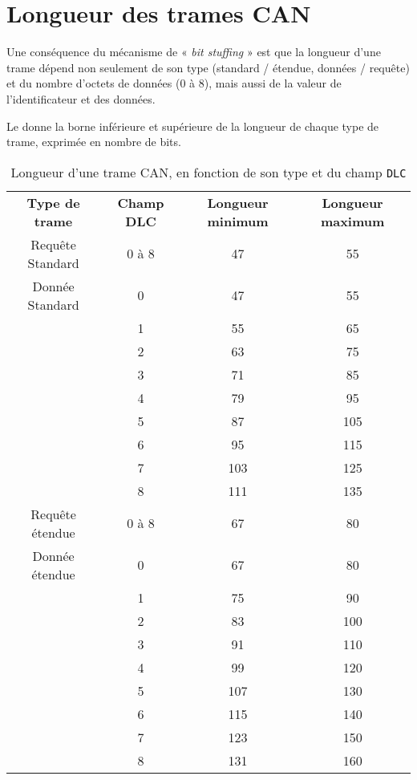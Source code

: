 \section{Longueur des trames CAN}

Une conséquence du mécanisme de « \emph{bit stuffing} » est que la longueur d'une trame dépend non seulement de son type (standard / étendue, données / requête) et du nombre d'octets de données ($0$ à $8$), mais aussi de la valeur de l'identificateur et des données.

Le  donne la borne inférieure et supérieure de la longueur de chaque type de trame, exprimée en nombre de bits.
 
\begin{table}[!t]
  \small
  \centering
  \begin{tabular}{cccc}
    \textbf{Type de trame}& \textbf{Champ DLC} & \textbf{Longueur minimum} & \textbf{Longueur maximum} \\
    Requête Standard & 0 à 8 & 47 & 55 \\
    Donnée Standard & 0 & 47 & 55 \\
             & 1 & 55 & 65 \\
             & 2 & 63 & 75 \\
             & 3 & 71 & 85 \\
             & 4 & 79 & 95 \\
             & 5 & 87 & 105 \\
             & 6 & 95 & 115 \\
             & 7 & 103 & 125 \\
             & 8 & 111 & 135 \\
    Requête étendue  & 0 à 8 & 67 & 80 \\
    Donnée étendue  & 0 & 67 & 80 \\
             & 1 & 75 & 90 \\
             & 2 & 83 & 100 \\
             & 3 & 91 & 110 \\
             & 4 & 99 & 120 \\
             & 5 & 107 & 130 \\
             & 6 & 115 & 140 \\
             & 7 & 123 & 150 \\
             & 8 & 131 & 160 \\
   \end{tabular}
  \caption{Longueur d'une trame CAN, en fonction de son type et du champ \texttt{DLC}}
  \ligne
\end{table}

